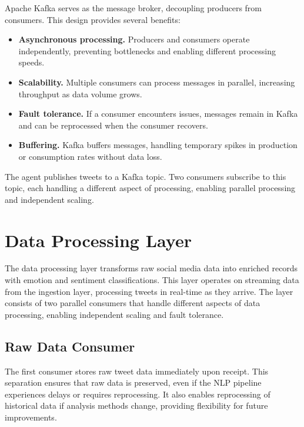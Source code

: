 Apache Kafka \cite{kreps2011kafka} serves as the message broker, decoupling producers from consumers. This design provides several benefits:

\begin{itemize}
\item \textbf{Asynchronous processing.} Producers and consumers operate independently, preventing bottlenecks and enabling different processing speeds.

\item \textbf{Scalability.} Multiple consumers can process messages in parallel, increasing throughput as data volume grows.

\item \textbf{Fault tolerance.} If a consumer encounters issues, messages remain in Kafka and can be reprocessed when the consumer recovers.

\item \textbf{Buffering.} Kafka buffers messages, handling temporary spikes in production or consumption rates without data loss.
\end{itemize}

The agent publishes tweets to a Kafka topic. Two consumers subscribe to this topic, each handling a different aspect of processing, enabling parallel processing and independent scaling.


\section{Data Processing Layer}

The data processing layer transforms raw social media data into enriched records with emotion and sentiment classifications. This layer operates on streaming data from the ingestion layer, processing tweets in real-time as they arrive. The layer consists of two parallel consumers that handle different aspects of data processing, enabling independent scaling and fault tolerance.

\subsection{Raw Data Consumer}

The first consumer stores raw tweet data immediately upon receipt. This separation ensures that raw data is preserved, even if the NLP pipeline experiences delays or requires reprocessing. It also enables reprocessing of historical data if analysis methods change, providing flexibility for future improvements.


